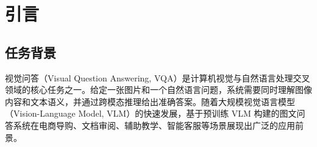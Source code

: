 \documentclass{SYSUReport}
\date{\today}
\begin{document}
\cover
\thispagestyle{empty}
\clearpage

\begin{abstract}

本文基于 Qwen2.5-VL-3B-Instruct 视觉语言模型，构建了一个智能图文问答助手，支持自然场景图片和文档/幻灯片截图两类图像的中文问答与多轮对话。系统采用 HuggingFace Transformers 推理框架，以 bfloat16 精度在 8GB 显存的 NVIDIA RTX 4060 上运行，使用 Gradio 构建 Web 交互界面，通过严格限制输入分辨率（max\_pixels=501760）确保推理稳定性。

在评测方面，系统在 VQA-v2 验证集子集（50 条样本）上取得了 78.0\% 的整体准确率，其中是否类问题准确率达 100.0\%，计数类问题 66.7\%；在 TextVQA 验证集子集（100 条样本）上取得了 72.0\% 的准确率。本文还构建了包含 24 张图片、69 条问答对的自建中文图文问答集，其中文档类（真实课程幻灯片）均分 4.40/5，整体均分 3.52/5。通过对错误样本的系统分类，分析了模型的视觉理解、推理能力和知识覆盖等方面的局限性，并从 AGI 视角讨论了当前多模态模型的潜力与瓶颈。

\textbf{关键词：}视觉语言模型；视觉问答；Qwen2.5-VL；多模态理解；Gradio

\end{abstract}
\thispagestyle{empty}
\clearpage

\setcounter{page}{1}
\tableofcontents
\clearpage

\setcounter{page}{1}

\section{引言}

\subsection{任务背景}

视觉问答（Visual Question Answering, VQA）是计算机视觉与自然语言处理交叉领域的核心任务之一。给定一张图片和一个自然语言问题，系统需要同时理解图像内容和文本语义，并通过跨模态推理给出准确答案。随着大规模视觉语言模型（Vision-Language Model, VLM）的快速发展，基于预训练 VLM 构建的图文问答系统在电商导购、文档审阅、辅助教学、智能客服等场景展现出广泛的应用前景。
\end{document}
